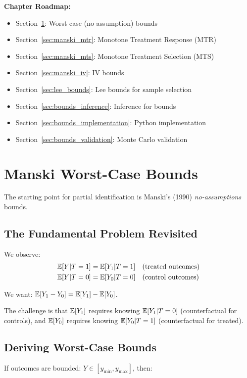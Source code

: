 \textbf{Chapter Roadmap:}
\begin{itemize}
    \item Section~\ref{sec:manski_worst}: Worst-case (no assumption) bounds
    \item Section~\ref{sec:manski_mtr}: Monotone Treatment Response (MTR)
    \item Section~\ref{sec:manski_mts}: Monotone Treatment Selection (MTS)
    \item Section~\ref{sec:manski_iv}: IV bounds
    \item Section~\ref{sec:lee_bounds}: Lee bounds for sample selection
    \item Section~\ref{sec:bounds_inference}: Inference for bounds
    \item Section~\ref{sec:bounds_implementation}: Python implementation
    \item Section~\ref{sec:bounds_validation}: Monte Carlo validation
\end{itemize}


\section{Manski Worst-Case Bounds}
\label{sec:manski_worst}

The starting point for partial identification is Manski's (1990) \emph{no-assumptions} bounds.

\subsection{The Fundamental Problem Revisited}

We observe:
\begin{align*}
\mathbb{E}[Y | T = 1] &= \mathbb{E}[Y_1 | T = 1] \quad \text{(treated outcomes)} \\
\mathbb{E}[Y | T = 0] &= \mathbb{E}[Y_0 | T = 0] \quad \text{(control outcomes)}
\end{align*}

We want: $\mathbb{E}[Y_1 - Y_0] = \mathbb{E}[Y_1] - \mathbb{E}[Y_0]$.

The challenge is that $\mathbb{E}[Y_1]$ requires knowing $\mathbb{E}[Y_1 | T = 0]$ (counterfactual for controls), and $\mathbb{E}[Y_0]$ requires knowing $\mathbb{E}[Y_0 | T = 1]$ (counterfactual for treated).

\subsection{Deriving Worst-Case Bounds}

If outcomes are bounded: $Y \in [y_{\min}, y_{\max}]$, then:

